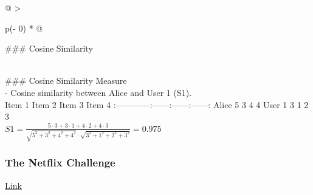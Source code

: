 \documentclass[
]{article}
\begin{document}
\begin{longtable}[]{@{}
  >{\raggedright\arraybackslash}p{(\columnwidth - 0\tabcolsep) * }@{}}
\toprule
\begin{minipage}[b]{\linewidth}\raggedright
\#\#\# Cosine Similarity
\end{minipage} \\
\midrule
\endhead
\#\#\# Cosine Similarity Measure \\
- Cosine similarity between Alice and User 1 (S1). \\
\textbar{} \textbar{} Item 1\textbar{} Item 2\textbar{} Item 3\textbar{}
Item 4\textbar{}
\textbar:------\textbar------:\textbar------:\textbar------:\textbar------:\textbar{}
\textbar Alice \textbar{} 5\textbar{} 3\textbar{} 4\textbar{}
4\textbar{} \textbar User 1 \textbar{} 3\textbar{} 1\textbar{}
2\textbar{} 3\textbar{} \\
\(S1  = \frac{5 \cdot 3 + 3 \cdot 1 + 4 \cdot 2 + 4 \cdot 3}{\sqrt{5^2+3^2+4^2+4^2}\cdot \sqrt{3^2+1^2+2^2+3^2}} = 0.975\) \\
\bottomrule
\end{longtable}

\hypertarget{the-netflix-challenge}{%
\subsubsection{The Netflix Challenge}\label{the-netflix-challenge}}

\href{Netflix_Prize.pptx}{Link}
\end{document}
